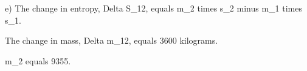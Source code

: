 e) The change in entropy, Delta S_12, equals m_2 times s_2 minus m_1 times s_1.

The change in mass, Delta m_12, equals 3600 kilograms.

m_2 equals 9355.